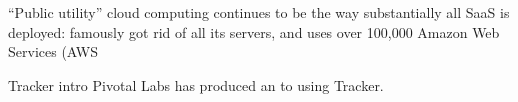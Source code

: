 “Public utility” cloud computing continues to be the way substantially all SaaS is deployed:  famously got rid of all its servers, and uses over 100,000 Amazon Web Services (AWS

\begin{sidebar}[-0.4in]{Tracker intro}
  Pivotal Labs has produced an
 to using Tracker.
\end{sidebar}


